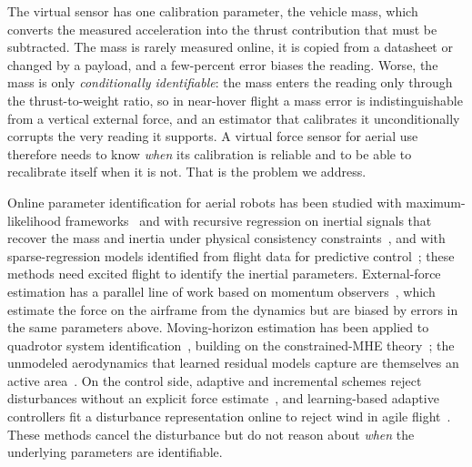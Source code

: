 \documentclass{ieeeaccess}
\begin{document}
The virtual sensor has one calibration parameter, the vehicle mass, which converts
the measured acceleration into the thrust contribution that must be subtracted.
The mass is rarely measured online, it is copied from a datasheet or changed by a
payload, and a few-percent error biases the reading. Worse, the mass is only
\emph{conditionally identifiable}: the mass enters the reading only through the
thrust-to-weight ratio, so in near-hover flight a mass error is indistinguishable
from a vertical external force, and an estimator that calibrates it unconditionally
corrupts the very reading it supports. A virtual force sensor for aerial use therefore needs
to know \emph{when} its calibration is reliable and to be able to recalibrate
itself when it is not. That is the problem we address.

Online parameter identification for aerial robots has been studied with
maximum-likelihood frameworks~\cite{burri2018system} and with recursive
regression on inertial signals that recover the mass and inertia under physical
consistency constraints~\cite{wuest2019online,wensing2017geometric}, and with
sparse-regression models identified from flight data for predictive
control~\cite{guevara2025sindy}; these
methods need excited flight to identify the inertial parameters. External-force
estimation has a parallel line of work based on momentum
observers~\cite{tomic2017external,ruggiero2014impedance,yuksel2014nonlinear,guevara2024estimation}, which estimate the
force on the airframe from the dynamics but are biased by errors in the same
parameters above. Moving-horizon estimation has been applied to quadrotor system
identification~\cite{wang2023neuromhe}, building on the constrained-MHE
theory~\cite{rao2003constrained}; the unmodeled aerodynamics that learned
residual models capture are themselves an active
area~\cite{bauersfeld2021neurobem,torrente2021data}. On the control side,
adaptive and incremental schemes reject disturbances without an explicit force
estimate~\cite{smeur2016adaptive,hanover2022performance,chen2016disturbance,zhang2024enhanced,liu2023adaptive}, and learning-based adaptive controllers fit a
disturbance representation online to reject wind in agile
flight~\cite{oconnell2022neuralfly}. These methods cancel the disturbance but do
not reason about \emph{when} the underlying parameters are identifiable.
\end{document}
